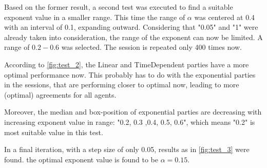             Based on the former result, a second test was executed to find a suitable exponent value in a smaller range. This time the range of $\alpha$ was centered at 0.4 with an interval of 0.1, expanding outward. Considering that "0.05" and "1" were already taken into consideration, the range of the exponent can now be limited. A range of $0.2-0.6$ was selected. The session is repeated only 400 times now. \\

            According to \autoref{fig:test_2}, the Linear and TimeDependent parties have a more optimal performance now. This probably has to do with the exponential parties in the sessions, that are performing closer to optimal now, leading to more (optimal) agreements for all agents. 
            
            Moreover, the median and box-position of exponential parties are decreasing with increasing exponent value in range: "0.2, 0.3 ,0.4, 0.5, 0.6", which means "0.2" is most suitable value in this test.
            
            In a final iteration, with a step size of only 0.05, results as in \autoref{fig:test_3} were found. the optimal exponent value is found to be $\alpha = 0.15$.   \\

